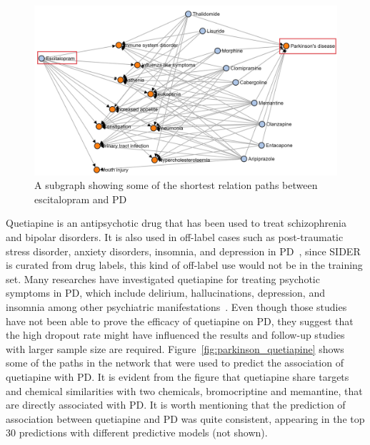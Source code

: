 \begin{figure}[h!]
    \centering
    \includegraphics[scale=0.6]
    {figures/parkinson_escitalopram.jpg}
    \caption [Escitalopram path subgraph in Parkinson's disease]{\label{fig:parkinson_escitalopram} A subgraph showing some of the shortest relation paths between escitalopram and \ac{PD}}
\end{figure}

Quetiapine is an antipsychotic drug that has been used to treat schizophrenia and bipolar disorders.
It is also used in off-label cases such as post-traumatic stress disorder, anxiety disorders, insomnia, and depression in \ac{PD}~\cite{el-saifi_quetiapine_2016}, since SIDER is curated from drug labels, this kind of off-label use would not be in the training set.
Many researches have investigated quetiapine for treating psychotic symptoms in \ac{PD}, which include delirium, hallucinations, depression, and insomnia among other psychiatric manifestations~\cite{desmarais_quetiapine_2016}.
Even though those studies have not been able to prove the efficacy of quetiapine on \ac{PD}, they suggest that the high dropout rate might have influenced the results and follow-up studies with larger sample size are required.
Figure~\ref{fig:parkinson_quetiapine} shows some of the paths in the network that were used to predict the association of quetiapine with \ac{PD}.
It is evident from the figure that quetiapine share targets and chemical similarities with two chemicals, bromocriptine and memantine, that are directly associated with \ac{PD}.
It is worth mentioning that the prediction of association between quetiapine and \ac{PD} was quite consistent, appearing in the top 30 predictions with different predictive models (not shown).


